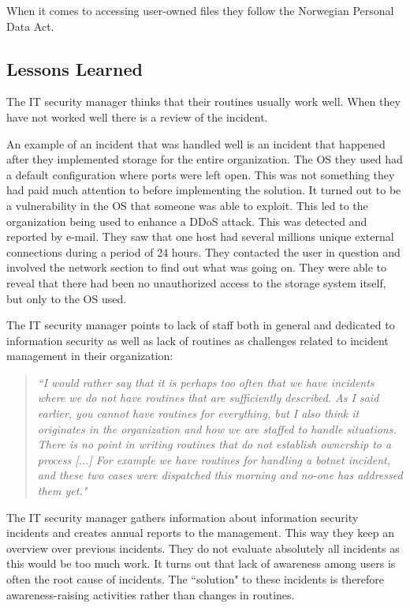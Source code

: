 When it comes to accessing user-owned files they follow the Norwegian Personal Data Act.

\subsection{Lessons Learned}
The IT security manager thinks that their routines usually work well. When they have not worked well there is a review of the incident.

An example of an incident that was handled well is an incident that happened after they implemented storage for the entire organization. The OS they used had a default configuration where ports were left open. This was not something they had paid much attention to before implementing the solution. It turned out to be a vulnerability in the OS that someone was able to exploit. This led to the organization being used to enhance a \ac{DDoS} attack. This was detected and reported by e-mail. They saw that one host had several millions unique external connections during a period of 24 hours. They contacted the user in question and involved the network section to find out what was going on. They were able to reveal that there had been no unauthorized access to the storage system itself, but only to the OS used.

The IT security manager points to lack of staff both in general and dedicated to information security as well as lack of routines as challenges related to incident management in their organization: 

\begin{quote}
\textit{``I would rather say that it is perhaps too often that we have incidents where we do not have routines that are sufficiently described. %
As I said earlier, you cannot have routines for everything, but I also think it originates in the organization and how we are staffed to handle situations. There is no point in writing routines that do not establish ownership to a process [...] For example we have routines for handling a botnet incident, and these two cases were dispatched this morning and no-one has addressed them yet."}
\end{quote}

The IT security manager gathers information about information security incidents and creates annual reports to the management. This way they keep an overview over previous incidents. They do not evaluate absolutely all incidents as this would be too much work. It turns out that lack of awareness among users is often the root cause of incidents. The ``solution" to these incidents is therefore awareness-raising activities rather than changes in routines.

